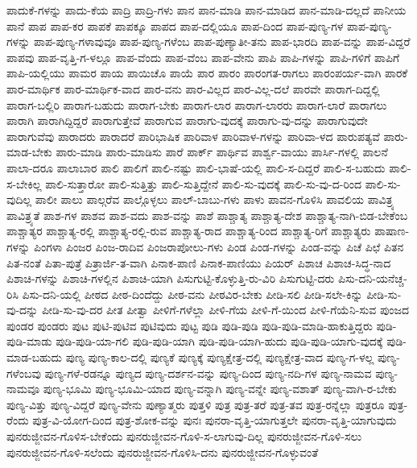 {ಪಾದುಕೆ-ಗಳನ್ನು
ಪಾದು-ಕೆಯ
ಪಾದ್ರಿ
ಪಾದ್ರಿ-ಗಳು
ಪಾನ
ಪಾನ-ಮಾಡಿ
ಪಾನ-ಮಾಡಿದ
ಪಾನ-ಮಾಡಿ-ದಲ್ಲದೆ
ಪಾನೀಯ
ಪಾನೆ
ಪಾಪ
ಪಾಪ-ಕರ
ಪಾಪಕೆ
ಪಾಪಕ್ಕೂ
ಪಾಪದ
ಪಾಪ-ದಲ್ಲಿಯೂ
ಪಾಪ-ದಿಂದ
ಪಾಪ-ಪುಣ್ಯ-ಗಳ
ಪಾಪ-ಪುಣ್ಯ-ಗಳನ್ನು
ಪಾಪ-ಪುಣ್ಯ-ಗಳಾವುವೂ
ಪಾಪ-ಪುಣ್ಯ-ಗಳೆಂಬ
ಪಾಪ-ಪುಣ್ಯಾತೀ-ತನು
ಪಾಪ-ಭಾರದಿ
ಪಾಪ-ವನ್ನು
ಪಾಪ-ವಿದ್ದರೆ
ಪಾಪವು
ಪಾಪ-ವೃತ್ತಿ-ಗ-ಳಲ್ಲೂ
ಪಾಪ-ವೆಂದು
ಪಾಪ-ವೆಂಬ
ಪಾಪ-ವೇನು
ಪಾಪಿ
ಪಾಪಿ-ಗಳನ್ನು
ಪಾಪಿ-ಗಳಿಗೆ
ಪಾಪಿಗೆ
ಪಾಪಿ-ಯಲ್ಲಿಯು
ಪಾಮರ
ಪಾಯ
ಪಾಯಿಚೊ
ಪಾಯೆ
ಪಾರ
ಪಾರಂ
ಪಾರಂಗತ-ರಾಗಲು
ಪಾರಂಪರ್ಯ-ವಾಗಿ
ಪಾರಕೆ
ಪಾರ-ಮಾರ್ಥಿಕ
ಪಾರ-ಮಾರ್ಥಿಕ-ವಾದ
ಪಾರ-ವನು
ಪಾರ-ವಿಲ್ಲದ
ಪಾರ-ವಿಲ್ಲ-ದಲೆ
ಪಾರವೇ
ಪಾರಾಗ-ದಿದ್ದಲ್ಲಿ
ಪಾರಾಗ-ಬಲ್ಲಿರಿ
ಪಾರಾಗ-ಬಹುದು
ಪಾರಾಗ-ಬೇಕು
ಪಾರಾಗ-ಲಾರ
ಪಾರಾಗ-ಲಾರರು
ಪಾರಾಗ-ಲಾರೆ
ಪಾರಾಗಲು
ಪಾರಾಗಿ
ಪಾರಾಗಿದ್ದಿದ್ದರೆ
ಪಾರಾಗುತ್ತೇವೆ
ಪಾರಾಗುವ
ಪಾರಾಗು-ವುದಕ್ಕೆ
ಪಾರಾಗು-ವು-ದನ್ನು
ಪಾರಾಗುವುದೇ
ಪಾರಾಗುವೆವು
ಪಾರಾದರು
ಪಾರಾದರೆ
ಪಾರಿಭಾಷಿಕ
ಪಾರಿವಾಳ
ಪಾರಿವಾಳ-ಗಳನ್ನು
ಪಾರಿವಾ-ಳದ
ಪಾರುಪತ್ಯವೆ
ಪಾರು-ಮಾಡ-ಬೇಕು
ಪಾರು-ಮಾಡಿ
ಪಾರು-ಮಾಡಿಸು
ಪಾರೆ
ಪಾರ್ಕ್
ಪಾರ್ಥಿವ
ಪಾರ್ಶ್ವ-ವಾಯು
ಪಾರ್ಸಿ-ಗಳಲ್ಲಿ
ಪಾಲನೆ
ಪಾಲಾ-ದರೂ
ಪಾಲಾಬಾರ
ಪಾಲಿ
ಪಾಲಿಗೆ
ಪಾಲಿ-ನಷ್ಟು
ಪಾಲಿ-ಭಾಷೆ-ಯಲ್ಲಿ
ಪಾಲಿ-ಸ-ದಿದ್ದರೆ
ಪಾಲಿ-ಸ-ಬಹುದು
ಪಾಲಿ-ಸ-ಬೇಕಿಲ್ಲ
ಪಾಲಿ-ಸುತ್ತಾರೋ
ಪಾಲಿ-ಸುತ್ತಿತ್ತು
ಪಾಲಿ-ಸುತ್ತಿದ್ದೇನೆ
ಪಾಲಿ-ಸು-ವುದಕ್ಕೆ
ಪಾಲಿ-ಸು-ವು-ದ-ರಿಂದ
ಪಾಲಿ-ಸು-ವುದಿಲ್ಲ
ಪಾಲೀ
ಪಾಲು
ಪಾಲ್ಗರೆವ
ಪಾಲ್ಗೊಳ್ಳಲು
ಪಾಲ್-ಬಾಬು-ಗಳು
ಪಾಳು
ಪಾವನ-ಗೊಳಿಸಿ
ಪಾವಲಿಯ
ಪಾವಿತ್ರ್ಯ
ಪಾವಿತ್ರ್ಯತೆ
ಪಾಶ-ಗಳ
ಪಾಶವ
ಪಾಶ-ವದು
ಪಾಶ-ವನ್ನು
ಪಾಶೆ
ಪಾಶ್ಚಾತ್ಯ
ಪಾಶ್ಚಾತ್ಯ-ದೇಶ
ಪಾಶ್ಚಾತ್ಯ-ನಾಗಿ-ಬಿಡ-ಬೇಕೆಂಬ
ಪಾಶ್ಚಾತ್ಯರ
ಪಾಶ್ಚಾತ್ಯ-ರಲ್ಲಿ
ಪಾಶ್ಚಾತ್ಯ-ರಲ್ಲಿ-ರುವ
ಪಾಶ್ಚಾತ್ಯ-ರಾದ
ಪಾಶ್ಚಾತ್ಯ-ರಿಂದ
ಪಾಶ್ಚಾತ್ಯ-ರಿಗೆ
ಪಾಶ್ಚಾತ್ಯರು
ಪಾಷಾಣ-ಗಳನ್ನು
ಪಿಂಗಳಾ
ಪಿಂಜರ
ಪಿಂಜ-ರಾದಿವ
ಪಿಂಜರಾಪೋಲು-ಗಳು
ಪಿಂಡ
ಪಿಂಡ-ಗಳನ್ನು
ಪಿಂಡ-ವನ್ನು
ಪಿಚೆ
ಪಿಛೆ
ಪಿತನ
ಪಿತ-ನಂತೆ
ಪಿತಾ-ಪುತ್ರೆ
ಪಿತ್ರಾರ್ಜಿ-ತ-ವಾಗಿ
ಪಿನಾಕ-ಪಾಣಿ
ಪಿನಾಕ-ಪಾಣಿಯು
ಪಿಯರ್
ಪಿಶಾಚ
ಪಿಶಾಚ-ಸಿದ್ಧ-ನಾದ
ಪಿಶಾಚಿ-ಗಳನ್ನು
ಪಿಶಾಚಿ-ಗಳಲ್ಲಿನ
ಪಿಶಾಚಿ-ಯಾಗಿ
ಪಿಸುಗುಟ್ಟಿ-ಕೊಳ್ಳುತ್ತಿ-ರು-ವಿರಿ
ಪಿಸುಗುಟ್ಟಿ-ದರು
ಪಿಸು-ದನಿ-ಯನೆಚ್ಚ-ರಿಸಿ
ಪಿಸು-ದನಿ-ಯಲ್ಲಿ
ಪೀಠದ
ಪೀಠ-ದಿಂದೆದ್ದು
ಪೀಠ-ವನು
ಪೀಠವಿರ-ಬೇಕು
ಪೀಡಿ-ಸಲಿ
ಪೀಡಿ-ಸಲೇ-ಕಿನ್ನು
ಪೀಡಿ-ಸು-ವು-ದನ್ನು
ಪೀಡಿ-ಸು-ವು-ದರ
ಪೀತ
ಪೀತ್ವಾ
ಪೀಳಿಗೆ-ಗಳೆಲ್ಲಾ
ಪೀಳಿ-ಗೆಯ
ಪೀಳಿ-ಗೆ-ಯಿಂದ
ಪೀಳಿ-ಗೆಯೆನಿ-ಸುವ
ಪುಂಜದ
ಪುಂಡರ
ಪುಂಡರು
ಪುಟ
ಪುಟಿ-ಪುಟಿವ
ಪುಟಿವುದು
ಪುಟ್ಟ
ಪುಡಿ
ಪುಡಿ-ಪುಡಿ
ಪುಡಿ-ಪುಡಿ-ಮಾಡಿ-ಹಾಕುತ್ತಿದ್ದರು
ಪುಡಿ-ಪುಡಿ-ಮಾಡು
ಪುಡಿ-ಪುಡಿ-ಯಾ-ಗಲಿ
ಪುಡಿ-ಪುಡಿ-ಯಾಗಿ
ಪುಡಿ-ಪುಡಿ-ಯಾಗಿ-ಹುದು
ಪುಡಿ-ಪುಡಿ-ಯಾಗು-ವುದಕ್ಕೆ
ಪುಡಿ-ಮಾಡ-ಬಹುದು
ಪುಣ್ಯ
ಪುಣ್ಯ-ಕಾಲ-ದಲ್ಲಿ
ಪುಣ್ಯಕೆ
ಪುಣ್ಯಕ್ಕೆ
ಪುಣ್ಯಕ್ಷೇತ್ರ-ದಲ್ಲಿ
ಪುಣ್ಯಕ್ಷೇತ್ರ-ವಾದ
ಪುಣ್ಯ-ಗ-ಳಲ್ಲ
ಪುಣ್ಯ-ಗಳೆಂಬವು
ಪುಣ್ಯ-ಗಳೆ-ರಡನ್ನೂ
ಪುಣ್ಯದ
ಪುಣ್ಯ-ದರ್ಶನ-ವನ್ನು
ಪುಣ್ಯ-ದಿಂದ
ಪುಣ್ಯ-ನದಿ-ಗಳ
ಪುಣ್ಯ-ನಾಮವ
ಪುಣ್ಯ-ನಾಮವೂ
ಪುಣ್ಯ-ಭೂಮಿ
ಪುಣ್ಯ-ಭೂಮಿ-ಯಾದ
ಪುಣ್ಯ-ವನ್ನಾಗಿ
ಪುಣ್ಯ-ವನ್ನೇ
ಪುಣ್ಯ-ವಶಾತ್
ಪುಣ್ಯ-ವಾಗಿ-ರ-ಬೇಕು
ಪುಣ್ಯ-ವಿತ್ತು
ಪುಣ್ಯ-ವಿದ್ದರೆ
ಪುಣ್ಯ-ವೇನು
ಪುಣ್ಯಾತ್ಮರು
ಪುತ್ತಳಿ
ಪುತ್ರ
ಪುತ್ರ-ತರೆ
ಪುತ್ರ-ತವ
ಪುತ್ರ-ರನ್ನೆಲ್ಲಾ
ಪುತ್ರರೂ
ಪುತ್ರ-ರೆಂದು
ಪುತ್ರ-ವಿ-ಯೋಗ-ದಿಂದ
ಪುತ್ರ-ಶೋಕ-ವನ್ನು
ಪುನಃ
ಪುನರಾ-ವೃತ್ತಿ-ಯಾಗುತ್ತಲೇ
ಪುನರಾ-ವೃತ್ತಿ-ಯಾಗುವುದು
ಪುನರುಜ್ಜೀವನ-ಗೊಳಿಸ-ಬೇಕೆಂದು
ಪುನರುಜ್ಜೀವನ-ಗೊಳಿ-ಸ-ಲಾಗುವು-ದಿಲ್ಲ
ಪುನರುಜ್ಜೀವನ-ಗೊಳಿ-ಸಲು
ಪುನರುಜ್ಜೀವನ-ಗೊಳಿ-ಸಲೆಂದು
ಪುನರುಜ್ಜೀವನ-ಗೊಳಿಸಿ-ದನು
ಪುನರುಜ್ಜೀವನ-ಗೊಳ್ಳುವಂತೆ
}
